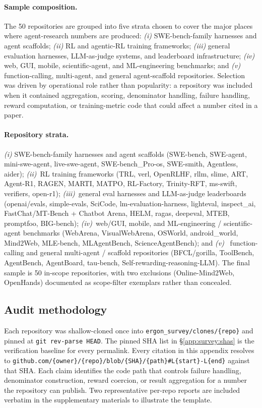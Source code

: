 \documentclass{article}
\begin{document}
\paragraph{Sample composition.}
The 50 repositories are grouped into five strata chosen to cover
the major places where agent-research numbers are produced:
\emph{(i)} SWE-bench-family harnesses and agent scaffolds;
\emph{(ii)} RL and agentic-RL training frameworks;
\emph{(iii)} general evaluation harnesses, LLM-as-judge systems,
and leaderboard infrastructure; \emph{(iv)} web, GUI, mobile,
scientific-agent, and ML-engineering benchmarks; and
\emph{(v)} function-calling, multi-agent, and general
agent-scaffold repositories. Selection was driven by operational
role rather than popularity: a repository was included when it
contained aggregation, scoring, denominator handling, failure
handling, reward computation, or training-metric code that could
affect a number cited in a paper.

\paragraph{Repository strata.}
\emph{(i)} SWE-bench-family harnesses and agent scaffolds
(SWE-bench, SWE-agent, mini-swe-agent, live-swe-agent,
SWE-bench\_Pro-os, SWE-smith, Agentless, aider);
\emph{(ii)}~RL training frameworks (TRL, verl, OpenRLHF, rllm,
slime, ART, Agent-R1, RAGEN, MARTI, MATPO, RL-Factory,
Trinity-RFT, ms-swift, verifiers, open-r1); \emph{(iii)}~general
eval harnesses and LLM-as-judge leaderboards (openai/evals,
simple-evals, SciCode, lm-evaluation-harness, lighteval,
inspect\_ai, FastChat/MT-Bench + Chatbot Arena, HELM, ragas,
deepeval, MTEB, promptfoo, BIG-bench); \emph{(iv)}~web/GUI,
mobile, and ML-engineering / scientific-agent benchmarks
(WebArena, VisualWebArena, OSWorld, android\_world, Mind2Web,
MLE-bench, MLAgentBench, ScienceAgentBench); and \emph{(v)}~%
function-calling and general multi-agent / scaffold repositories
(BFCL/gorilla, ToolBench, AgentBench, AgentBoard, tau-bench,
Self-rewarding-reasoning-LLM). The final sample is 50 in-scope
repositories, with two exclusions (Online-Mind2Web, OpenHands)
documented as scope-filter exemplars rather than concealed.

\subsection{Audit methodology}
\label{app:survey:method}

Each repository was shallow-cloned once into
\texttt{ergon\_survey/clones/\{repo\}} and pinned at \texttt{git
rev-parse HEAD}. The pinned SHA list in
\S\ref{app:survey:shas} is the verification baseline for every
permalink. Every citation in this appendix
resolves to
\texttt{github.com/\{owner\}/\{repo\}/blob/\{SHA\}/\{path\}\#L\{start\}-L\{end\}}
against that SHA. Each claim identifies the code path that
controls failure handling, denominator construction, reward
coercion, or result aggregation for a number the repository
can publish. Two representative per-repo reports are included
verbatim in the supplementary materials to illustrate the
template.
\end{document}
